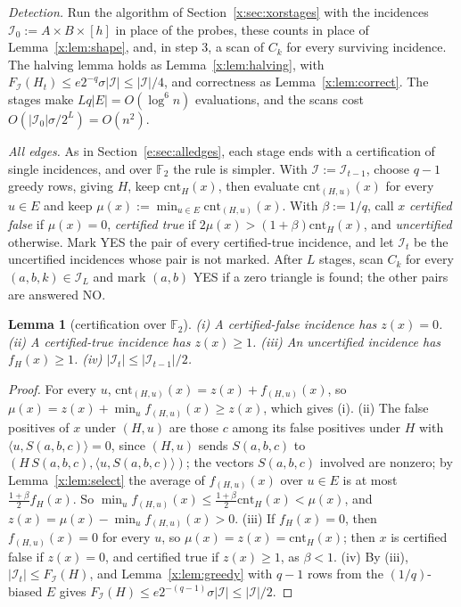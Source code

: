 \documentclass[11pt]{article}
\newtheorem{lemma}[theorem]{Lemma}
\theoremstyle{definition}
\theoremstyle{remark}
\newcommand{\F}{\mathbb{F}_2}
\newcommand{\cnt}{\mathrm{cnt}}
\newcommand{\Iq}{\mathcal{I}}
\begin{document}
\emph{Detection.} Run the algorithm of Section~\ref{x:sec:xorstages} with the incidences $\Iq_0:=A\times B\times[h]$ in place of the probes, these counts in place of Lemma~\ref{x:lem:shape}, and, in step 3, a scan of $C_k$ for every surviving incidence. The halving lemma holds as Lemma~\ref{x:lem:halving}, with $F_\Iq(H_t)\le e2^{-q}\sigma|\Iq|\le|\Iq|/4$, and correctness as Lemma~\ref{x:lem:correct}. The stages make $Lq|E|=O(\log^6n)$ evaluations, and the scans cost $O(|\Iq_0|\sigma/2^L)=O(n^2)$.

\emph{All edges.} As in Section~\ref{e:sec:alledges}, each stage ends with a certification of single incidences, and over $\F$ the rule is simpler. With $\Iq:=\Iq_{t-1}$, choose $q-1$ greedy rows, giving $H$, keep $\cnt_H(x)$, then evaluate $\cnt_{(H,u)}(x)$ for every $u\in E$ and keep $\mu(x):=\min_{u\in E}\cnt_{(H,u)}(x)$. With $\beta:=1/q$, call $x$ \emph{certified false} if $\mu(x)=0$, \emph{certified true} if $2\mu(x)>(1+\beta)\cnt_H(x)$, and \emph{uncertified} otherwise. Mark YES the pair of every certified-true incidence, and let $\Iq_t$ be the uncertified incidences whose pair is not marked. After $L$ stages, scan $C_k$ for every $(a,b,k)\in\Iq_L$ and mark $(a,b)$ YES if a zero triangle is found; the other pairs are answered NO.

\begin{lemma}[certification over $\F$]\label{x:lem:cert}
\textup{(i)} A certified-false incidence has $z(x)=0$. \textup{(ii)} A certified-true incidence has $z(x)\ge1$. \textup{(iii)} An uncertified incidence has $f_H(x)\ge1$. \textup{(iv)} $|\Iq_t|\le|\Iq_{t-1}|/2$.
\end{lemma}
\begin{proof}
For every $u$, $\cnt_{(H,u)}(x)=z(x)+f_{(H,u)}(x)$, so $\mu(x)=z(x)+\min_uf_{(H,u)}(x)\ge z(x)$, which gives (i). (ii) The false positives of $x$ under $(H,u)$ are those $c$ among its false positives under $H$ with $\langle u,S(a,b,c)\rangle=0$, since $(H,u)$ sends $S(a,b,c)$ to $(H\,S(a,b,c),\langle u,S(a,b,c)\rangle)$; the vectors $S(a,b,c)$ involved are nonzero; by Lemma~\ref{x:lem:select} the average of $f_{(H,u)}(x)$ over $u\in E$ is at most $\frac{1+\beta}2f_H(x)$. So $\min_uf_{(H,u)}(x)\le\frac{1+\beta}2\cnt_H(x)<\mu(x)$, and $z(x)=\mu(x)-\min_uf_{(H,u)}(x)>0$. (iii) If $f_H(x)=0$, then $f_{(H,u)}(x)=0$ for every $u$, so $\mu(x)=z(x)=\cnt_H(x)$; then $x$ is certified false if $z(x)=0$, and certified true if $z(x)\ge1$, as $\beta<1$. (iv) By (iii), $|\Iq_t|\le F_\Iq(H)$, and Lemma~\ref{x:lem:greedy} with $q-1$ rows from the $(1/q)$-biased $E$ gives $F_\Iq(H)\le e2^{-(q-1)}\sigma|\Iq|\le|\Iq|/2$.
\end{proof}
\end{document}
